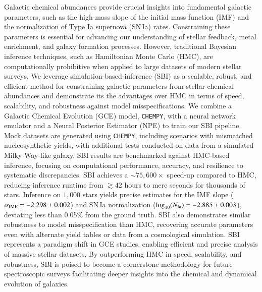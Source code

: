 \documentclass{aa}
\begin{document}
 \abstract
   {Galactic chemical abundances provide crucial insights into fundamental galactic parameters, such as the high-mass slope of the initial mass function (IMF) and the normalization of Type Ia supernova (SN\,Ia) rates. Constraining these parameters is essential for advancing our understanding of stellar feedback, metal enrichment, and galaxy formation processes. However, traditional Bayesian inference techniques, such as Hamiltonian Monte Carlo (HMC), are computationally prohibitive when applied to large datasets of modern stellar surveys.}
   {We leverage simulation-based-inference (SBI) as a scalable, robust, and efficient method for constraining galactic parameters from stellar chemical abundances and demonstrate its the advantages over HMC in terms of speed, scalability, and robustness against model misspecifications.}
   {We combine a Galactic Chemical Evolution (GCE) model, \texttt{CHEMPY}, with a neural network emulator and a Neural Posterior Estimator (NPE) to train our SBI pipeline. Mock datasets are generated using \texttt{CHEMPY}, including scenarios with mismatched nucleosynthetic yields, with additional tests conducted on data from a simulated Milky Way-like galaxy. SBI results are benchmarked against HMC-based inference, focusing on computational performance, accuracy, and resilience to systematic discrepancies.}
   {SBI achieves a $\sim75,600\times$ speed-up compared to HMC, reducing inference runtime from $\gtrsim42$ hours to mere seconds for thousands of stars. Inference on $1,000$ stars yields precise estimates for the IMF slope ($\alpha_{\rm IMF} = -2.298 \pm 0.002$) and SN\,Ia normalization ($\log_{10}(N_{\rm Ia}) = -2.885 \pm 0.003$), deviating less than 0.05\% from the ground truth. SBI also demonstrates similar robustness to model misspecification than HMC, recovering accurate parameters even with alternate yield tables or data from a cosmological simulation.}
   {SBI represents a paradigm shift in GCE studies, enabling efficient and precise analysis of massive stellar datasets. By outperforming HMC in speed, scalability, and robustness, SBI is poised to become a cornerstone methodology for future spectroscopic surveys facilitating deeper insights into the chemical and dynamical evolution of galaxies.}
\end{document}
